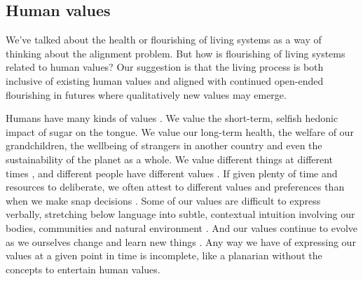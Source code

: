\documentclass[11pt]{article}
\begin{document}





\subsection{Human values}


We've talked about the health or flourishing of living systems as a way of thinking about the alignment problem. But how is flourishing of living systems related to human values? Our suggestion is that the living process is both inclusive of existing human values and aligned with continued open-ended flourishing in futures where qualitatively new values may emerge. 

Humans have many kinds of values \citep{minsky1986society,tetlock1986value, nagel1979fragmentation, williams1981conflicts, stocker1992plural, haidt2001emotional}. We value the short-term, selfish hedonic impact of sugar on the tongue. We value our long-term health, the welfare of our grandchildren, the wellbeing of strangers in another country and even the sustainability of the planet as a whole. We value different things at different times \citep{ainslie1992picoeconomics, loewenstein1996out, kohlberg1981philosophy, bardi2011dual}, and different people have different values \citep{rawls1993political,sorensen2024roadmap, berlin1969two, leibo2025societal, leibo2026theory}. If given plenty of time and resources to deliberate, we often attest to different values and preferences than when we make snap decisions \citep{yudkowsky2004coherent, rawls1971theory, firth1952ethical, brandt1979theory, smith1994moral, railton1986moral}. Some of our values are difficult to express verbally, stretching below language into subtle, contextual intuition involving our bodies, communities and natural environment \citep{nussbaum2001fragility, scott1998seeing, polanyi1966tacit, dreyfus1972computers, varela1991embodied, wittgenstein1922tractatus}. And our values continue to evolve as we ourselves change and learn new things \citep{singer1981expanding, murdoch2013sovereignty, williams1985ethics, dewey1939theory,gadamer1960wahrheit, nietzsche1883zarathustra,leibo2025societal}. Any way we have of expressing our values at a given point in time is incomplete, like a planarian without the concepts to entertain human values.
\end{document}
